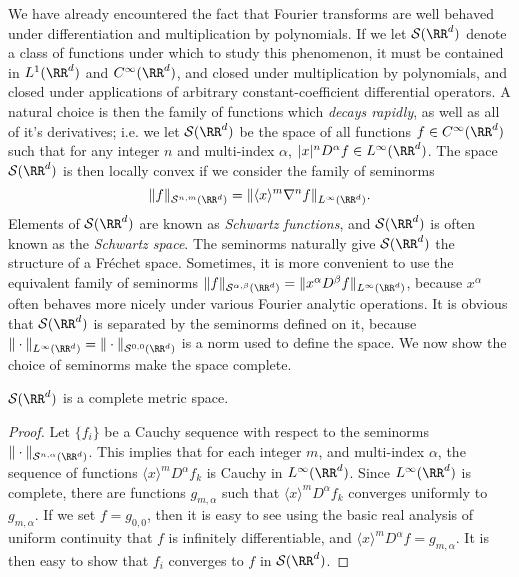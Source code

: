We have already encountered the fact that Fourier transforms are well behaved under differentiation and multiplication by polynomials. If we let $\mathcal{S}(\RR^d)$ denote a class of functions under which to study this phenomenon, it must be contained in $L^1(\RR^d)$ and $C^\infty(\RR^d)$, and closed under multiplication by polynomials, and closed under applications of arbitrary constant-coefficient differential operators. A natural choice is then the family of functions which \emph{decays rapidly}, as well as all of it's derivatives; i.e. we let $\mathcal{S}(\RR^d)$ be the space of all functions $f \in C^\infty(\RR^d)$ such that for any integer $n$ and multi-index $\alpha$, $|x|^n D^\alpha f \in L^\infty(\RR^d)$. The space $\mathcal{S}(\RR^d)$ is then locally convex if we consider the family of seminorms
%
\[ \| f \|_{\mathcal{S}^{n,m}(\RR^d)} = \| \langle x \rangle^m \nabla^n f \|_{L^\infty(\RR^d)}. \]
%
Elements of $\mathcal{S}(\RR^d)$ are known as \emph{Schwartz functions}, and $\mathcal{S}(\RR^d)$ is often known as the \emph{Schwartz space}. The seminorms naturally give $\mathcal{S}(\RR^d)$ the structure of a Fr\'{e}chet space. Sometimes, it is more convenient to use the equivalent family of seminorms $\| f \|_{\mathcal{S}^{\alpha, \beta}(\RR^d)} = \| x^\alpha D^\beta f \|_{L^\infty(\RR^d)}$, because $x^\alpha$ often behaves more nicely under various Fourier analytic operations. It is obvious that $\mathcal{S}(\RR^d)$ is separated by the seminorms defined on it, because $\| \cdot \|_{L^\infty(\RR^d)} = \| \cdot \|_{\mathcal{S}^{0,0}(\RR^d)}$ is a norm used to define the space. We now show the choice of seminorms make the space complete.

\begin{theorem}
    $\mathcal{S}(\RR^d)$ is a complete metric space.
\end{theorem}
\begin{proof}
    Let $\{ f_i \}$ be a Cauchy sequence with respect to the seminorms $\| \cdot \|_{\mathcal{S}^{n,\alpha}(\RR^d)}$. This implies that for each integer $m$, and multi-index $\alpha$, the sequence of functions $\langle x \rangle^m D^\alpha f_k$ is Cauchy in $L^\infty(\RR^d)$. Since $L^\infty(\RR^d)$ is complete, there are functions $g_{m,\alpha}$ such that $\langle x \rangle^m D^\alpha f_k$ converges uniformly to $g_{m,\alpha}$. If we set $f = g_{0,0}$, then it is easy to see using the basic real analysis of uniform continuity that $f$ is infinitely differentiable, and $\langle x \rangle^m D^\alpha f = g_{m,\alpha}$. It is then easy to show that $f_i$ converges to $f$ in $\mathcal{S}(\RR^d)$.
\end{proof}

